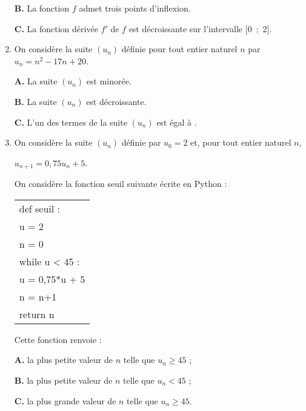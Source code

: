 \begin{enumerate}
\textbf{B.}  La fonction $f$ admet trois points d'inflexion.

\textbf{C.} La fonction dérivée $f'$ de $f$ est décroissante sur l'intervalle [0~;~2].


\item  On considère la suite $\left(u_n\right)$ définie pour tout entier naturel $n$ par $u_n = n^2 - 17n + 20$. 

\textbf{A.} La suite $\left(u_n\right)$ est minorée.

\textbf{B.} La suite $\left(u_n\right)$ est décroissante.

\textbf{C.} L'un des termes de la suite $\left(u_n\right)$ est égal à .
\item On considère la suite $\left(u_n\right)$ définie par $u_0 = 2$ et, pour tout entier naturel $n$,\,

 $u_{n+1} = 0,75u_n +5$.

On considère la fonction \og seuil \fg{} suivante écrite en Python :

\begin{center}
\begin{tabular}{|l|}\hline
def seuil {} :\\
\quad u = 2\\
\quad n = 0\\
\quad while u < 45 :\\
\qquad u = 0,75*u + 5\\
\qquad n = n+1\\
\quad return n\\ \hline
\end{tabular}
\end{center}

Cette fonction renvoie :

\textbf{A.} la plus petite valeur de $n$ telle que $u_n \geqslant  45$ ;
 
\textbf{B.} la plus petite valeur de $n$ telle que $u_n  < 45$ ;
 
\textbf{C.} la plus grande valeur de $n$ telle que $u_n \geqslant 45$.
\end{enumerate}

\bigskip

